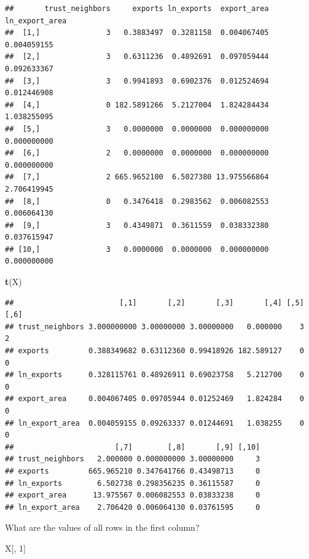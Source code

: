 \documentclass[
]{book}
\newenvironment{Shaded}{\begin{snugshade}}{\end{snugshade}}
\newcommand{\DecValTok}[1]{\textcolor[rgb]{0.00,0.00,0.81}{#1}}
\newcommand{\KeywordTok}[1]{\textcolor[rgb]{0.13,0.29,0.53}{\textbf{#1}}}
\newcommand{\NormalTok}[1]{#1}
\theoremstyle{definition}
\theoremstyle{definition}
\theoremstyle{definition}
\theoremstyle{definition}
\theoremstyle{remark}
\begin{document}
\begin{verbatim}
##       trust_neighbors     exports ln_exports  export_area ln_export_area
##  [1,]               3   0.3883497  0.3281158  0.004067405    0.004059155
##  [2,]               3   0.6311236  0.4892691  0.097059444    0.092633367
##  [3,]               3   0.9941893  0.6902376  0.012524694    0.012446908
##  [4,]               0 182.5891266  5.2127004  1.824284434    1.038255095
##  [5,]               3   0.0000000  0.0000000  0.000000000    0.000000000
##  [6,]               2   0.0000000  0.0000000  0.000000000    0.000000000
##  [7,]               2 665.9652100  6.5027380 13.975566864    2.706419945
##  [8,]               0   0.3476418  0.2983562  0.006082553    0.006064130
##  [9,]               3   0.4349871  0.3611559  0.038332380    0.037615947
## [10,]               3   0.0000000  0.0000000  0.000000000    0.000000000
\end{verbatim}

\begin{Shaded}
\begin{Highlighting}[]
\KeywordTok{t}\NormalTok{(X)}
\end{Highlighting}
\end{Shaded}

\begin{verbatim}
##                        [,1]       [,2]       [,3]       [,4] [,5] [,6]
## trust_neighbors 3.000000000 3.00000000 3.00000000   0.000000    3    2
## exports         0.388349682 0.63112360 0.99418926 182.589127    0    0
## ln_exports      0.328115761 0.48926911 0.69023758   5.212700    0    0
## export_area     0.004067405 0.09705944 0.01252469   1.824284    0    0
## ln_export_area  0.004059155 0.09263337 0.01244691   1.038255    0    0
##                       [,7]        [,8]       [,9] [,10]
## trust_neighbors   2.000000 0.000000000 3.00000000     3
## exports         665.965210 0.347641766 0.43498713     0
## ln_exports        6.502738 0.298356235 0.36115587     0
## export_area      13.975567 0.006082553 0.03833238     0
## ln_export_area    2.706420 0.006064130 0.03761595     0
\end{verbatim}

What are the values of all rows in the first column?

\begin{Shaded}
\begin{Highlighting}[]
\NormalTok{X[, }\DecValTok{1}\NormalTok{]}
\end{Highlighting}
\end{Shaded}
\end{document}
